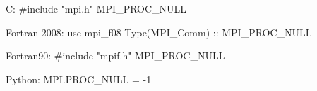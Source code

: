 C:
#include "mpi.h"
MPI_PROC_NULL

Fortran 2008:
use mpi_f08
Type(MPI_Comm) :: MPI_PROC_NULL

Fortran90:
#include "mpif.h"
MPI_PROC_NULL

Python:
MPI.PROC_NULL = -1
